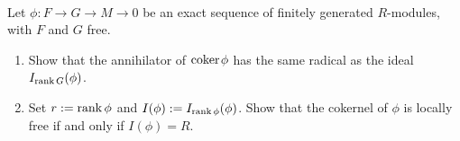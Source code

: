 \begin{exercise}~\label{Fitt}
 
 Let $\phi: F\to G \to M\to 0$ be an exact sequence of finitely generated $R$-modules, 
with $F$ and $G$ free. 

\begin{enumerate}

\item Show that the annihilator of  ${\rm{coker}\kern1pt} \phi$ has the
same radical as the ideal $I_{\operatorname{rank} G}(\phi)$.

 \item Set $r:= \operatorname{rank} \phi$ and  $I(\phi): = I_{\operatorname{rank} \phi}(\phi)$. Show that the cokernel of $\phi$
is locally free if and only if $I(\phi) = R$. 

\end{enumerate}
\end{exercise}






%
%
%
%
